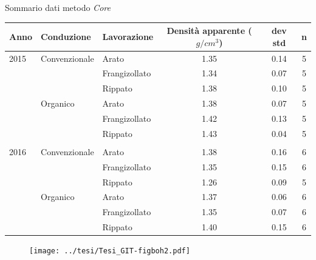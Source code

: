 \documentclass[10pt]{beamer}
\begin{document}
\begin{frame}{Sommario dati metodo \emph{Core}}
  \footnotesize
  \begin{table}[ht]
    \centering
    \begin{tabular}{lllccc}
      \hline
      Anno & Conduzione & Lavorazione & Densit\`a apparente
                                        ($g/cm^3$) & dev std & n \\ 
      \hline
      2015 & Convenzionale & Arato & 1.35 & 0.14 &   5 \\ 
           &   & Frangizollato & 1.34 & 0.07 &   5 \\ 
           &   & Rippato & 1.38 & 0.10 &   5 \\ 
           & Organico & Arato & 1.38 & 0.07 &   5 \\ 
           &   & Frangizollato & 1.42 & 0.13 &   5 \\ 
           &   & Rippato & 1.43 & 0.04 &   5 \\ 
      \\
      2016 & Convenzionale & Arato & 1.38 & 0.16 &   6 \\ 
           &   & Frangizollato & 1.35 & 0.15 &   6 \\ 
           &   & Rippato & 1.26 & 0.09 &   5 \\ 
           & Organico & Arato & 1.37 & 0.06 &   6 \\ 
           &   & Frangizollato & 1.35 & 0.07 &   6 \\ 
           &   & Rippato & 1.40 & 0.15 &   6 \\ 
      \hline
    \end{tabular}
    \label{tab:RiassuntoDensitaCAmpo}
  \end{table}
\end{frame}

\begin{frame}
  \begin{figure}[ht]
    \texttt{[image: ../tesi/Tesi\_GIT-figboh2.pdf]}
  \end{figure}
\end{frame}
\end{document}
